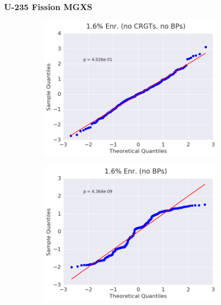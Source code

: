 \subsubsection{U-235 Fission MGXS}
\label{subsubsec:chap9-qq-plots-fiss}

\begin{figure}[h!]
\centering
\begin{subfigure}{0.5\textwidth}
  \centering
  \includegraphics[width=\linewidth]{figures/patterns/assm-1.6-inf/quantile/assm-16-inf-fiss-2}
  \caption{}
  \label{fig:chap9-qq-assm-1.6-inf-fiss}
\end{subfigure}%
\begin{subfigure}{0.5\textwidth}
  \centering
  \includegraphics[width=\linewidth]{figures/patterns/assm-1.6/quantile/assm-16-fiss-2}

\end{subfigure}
\end{figure}
